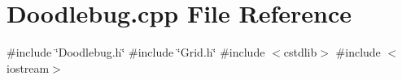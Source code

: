 \section{Doodlebug.\+cpp File Reference}
\label{Doodlebug_8cpp}
{\ttfamily \#include \char`\"{}Doodlebug.\+h\char`\"{}}\newline
{\ttfamily \#include \char`\"{}Grid.\+h\char`\"{}}\newline
{\ttfamily \#include $<$cstdlib$>$}\newline
{\ttfamily \#include $<$iostream$>$}\newline
